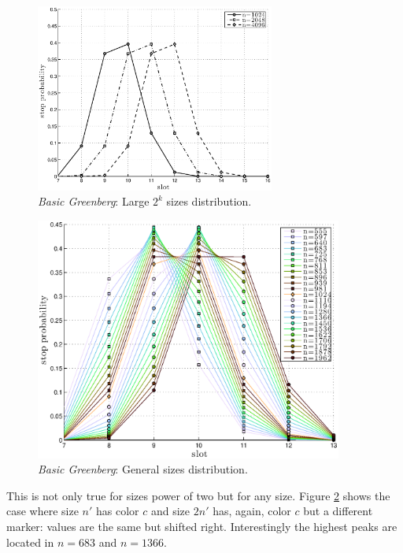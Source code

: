 \documentclass[11pt,a4paper,twoside,openright]{book}
\begin{document}
\begin{figure}[H]
\begin{center}
\includegraphics[width=0.7\textwidth]{matlab/Greenberg_stop_prob/greenberg-stop-distribution-uniformity}
\caption{\emph{Basic Greenberg}:  Large $2^{k}$ sizes distribution.}
\label{fig:greenberg-dist-large}
\end{center}
\end{figure}


\begin{figure}[H]
\begin{center}
\includegraphics[width=0.9\textwidth]{matlab/Greenberg_stop_prob/greenberg-stop-distribution-intermediate-values}
\caption{\emph{Basic Greenberg}:  General sizes distribution.}
\label{fig:greenberg-dist-general}
\end{center}
\end{figure}
This is not only true for sizes power of two but for any size. Figure \ref{fig:greenberg-dist-general} shows the case where size $n'$ has color $c$ and size $2n'$ has, again, color $c$ but a different marker: values are the same but shifted right. Interestingly the highest peaks are located in $n=683$ and $n=1366$.
\end{document}
